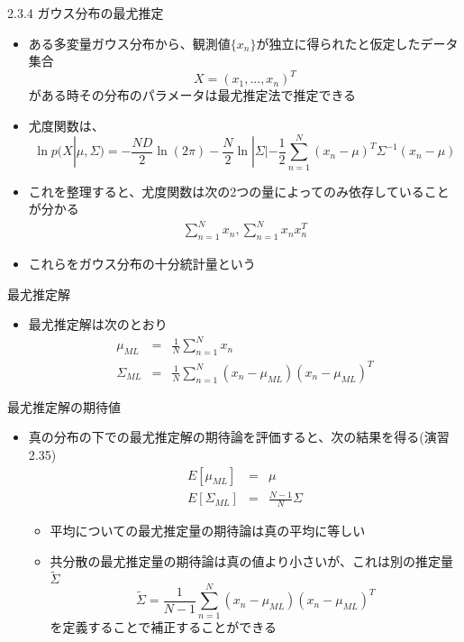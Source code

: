 \begin{frame}{2.3.4 ガウス分布の最尤推定}
 \begin{itemize}
  \item  ある多変量ガウス分布から、観測値$\{x_n\}$が独立に得られたと仮定したデータ集合
         \begin{equation}
          X=(x_1,...,x_n)^T
         \end{equation}
         がある時その分布のパラメータは最尤推定法で推定できる
  \item 尤度関数は、
        \begin{equation}
         \ln  p(X|\mu, \Sigma) = -\frac{ND}{2}\ln (2\pi)-\frac{N}{2}\ln |\Sigma|-\frac{1}{2}\sum_{n=1}^{N}(x_n-\mu)^T\Sigma^{-1}(x_n-\mu)
        \end{equation}
  \item これを整理すると、尤度関数は次の2つの量によってのみ依存していることが分かる
        \begin{eqnarray}
         \sum_{n=1}^{N}x_n,  \sum_{n=1}^{N}x_nx_n^T
        \end{eqnarray}
  \item これらをガウス分布の\alert{十分統計量}という
 \end{itemize}
\end{frame}

\begin{frame}{最尤推定解}
 \begin{itemize}
  \item 最尤推定解は次のとおり
        \begin{eqnarray}
         \mu_{ML} &=& \frac{1}{N}\sum_{n=1}^{N}x_n\\
         \Sigma_{ML}&=&\frac{1}{N}\sum_{n=1}^{N}(x_n-\mu_{ML})(x_n-\mu_{ML})^T
        \end{eqnarray}
 \end{itemize}
\end{frame}

\begin{frame}{最尤推定解の期待値}
 \begin{itemize}
  \item 真の分布の下での最尤推定解の期待論を評価すると、次の結果を得る(演習2.35)
        \begin{eqnarray}
         E[\mu_{ML}]&=&\mu\\
         E[\Sigma_{ML}]&=&\frac{N-1}{N}\Sigma
        \end{eqnarray}
        \begin{itemize}
         \item 平均についての最尤推定量の期待論は真の平均に等しい
         \item 共分散の最尤推定量の期待論は真の値より小さいが、これは別の推定量$\widetilde{\Sigma}$
               \begin{equation}
                \widetilde{\Sigma} = \frac{1}{N-1}\sum_{n=1}^{N}(x_n-\mu_{ML})(x_n-\mu_{ML})^T
               \end{equation}
               を定義することで補正することができる
        \end{itemize}
 \end{itemize}
\end{frame}
